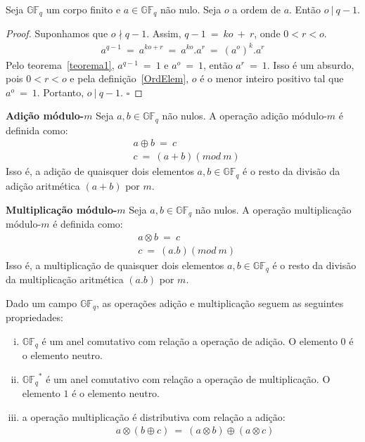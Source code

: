 \begin{theorem} \label{teorema2} Seja $\mathbb{GF}_q$ um corpo finito e $a \in \mathbb{GF}_q$ não nulo. Seja $o$ a ordem de $a$. Então $o\ |\ q-1$.
\end{theorem}

\begin{proof} Suponhamos que $o \nmid q-1$. Assim, $q-1\ =\ ko\ +\ r$, onde $0 < r < o$.
$$
\begin{array}{cl}
a^{q-1}\ =\ a^{ko+r}\ =\ a^{ko}.a^r\ =\ (a^o)^k.a^r
\end{array}
$$
Pelo teorema~\ref{teorema1}, $a^{q-1}\ =\ 1$ e $a^o\ =\ 1$, então $a^r\ =\ 1$. Isso é um absurdo, pois $0 < r < o$ e pela definição~\ref{OrdElem}, $o$ é o menor inteiro positivo tal que $a^o\ =\ 1$. Portanto, $o\ |\ q-1$. $\square$
\end{proof}

\begin{definition} {\bf Adição módulo-$m$} \label{AdicaoM}  Seja $a,b  \in \mathbb{GF}_q$ não nulos. A operação adição módulo-$m$ é definida  como:
\begin{align*}
& a \oplus b\ =\ c\\
& c\ =\ (a+b)(mod\ m)
\end{align*}
Isso é, a adição de quaisquer dois elementos $a,b \in \mathbb{GF}_q$ é o resto da divisão da adição aritmética $(a+b)$ por $m$.
\end{definition}

\begin{definition} {\bf Multiplicação módulo-$m$} \label{MultiM}  Seja $a,b  \in \mathbb{GF}_q$ não nulos. A operação multiplicação módulo-$m$ é definida  como:
\begin{align*}
& a \otimes b\ =\ c\\
& c\ =\ (a.b)(mod\ m)
\end{align*}
Isso é, a multiplicação de quaisquer dois elementos $a,b \in \mathbb{GF}_q$ é o resto da divisão da multiplicação aritmética $(a.b)$ por $m$.
\end{definition}

\begin{definition} 
Dado um campo $\mathbb{GF}_q$, as operações adição e multiplicação seguem as seguintes propriedades:
\begin{enumerate}[(i)]
   \item $\mathbb{GF}_q$ é um anel comutativo com relação a operação de adição. O elemento $0$ é o elemento neutro.
   \item ${\mathbb{GF}_q}^*$ é um anel comutativo com relação a operação de multiplicação. O elemento $1$ é o elemento neutro.
   \item a operação multiplicação é distributiva com relação a adição:
      \begin{align*}
         & a \otimes (b \oplus c)\ =\ (a \otimes b) \oplus (a \otimes c)
      \end{align*}
\end{enumerate}
\end{definition}

